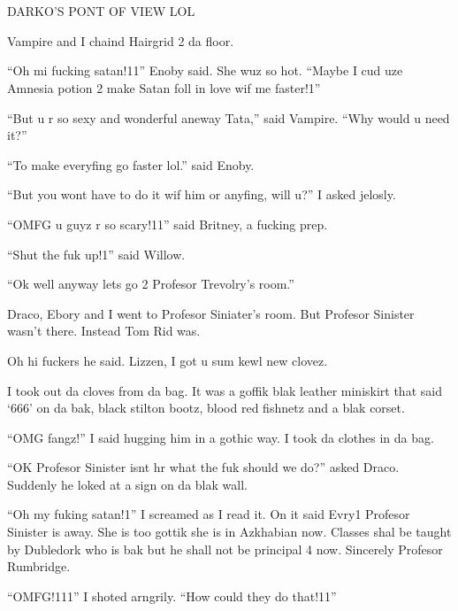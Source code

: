 \section{}


\XXX{\Xfill 666\Xfill}

DARKO'S PONT OF VIEW LOL

Vampire and I chaind Hairgrid 2 da floor.

\enquote{Oh mi fucking satan!11} Enoby said. She wuz so hot. \enquote{Maybe I cud uze Amnesia potion 2 make Satan foll in love wif me faster!1}

\enquote{But u r so sexy and wonderful aneway Tata,} said Vampire. \enquote{Why would u need it?}

\enquote{To make everyfing go faster lol.} said Enoby.

\enquote{But you wont have to do it wif him or anyfing, will u?} I asked jelosly.

\enquote{OMFG u guyz r so scary!11} said Britney, a fucking prep.

\enquote{Shut the fuk up!1} said Willow.

\enquote{Ok well anyway lets go 2 Profesor Trevolry's room.}

Draco, Ebory and I went to Profesor Siniater's room. But Profesor Sinister wasn't there. Instead Tom Rid was.

Oh hi fuckers he said. Lizzen, I got u sum kewl new clovez.

I took out da cloves from da bag. It was a goffik blak leather miniskirt that said \enquote*{666} on da bak, black stilton bootz, blood red fishnetz and a blak corset.

\enquote{OMG fangz!} I said hugging him in a gothic way. I took da clothes in da bag.

\enquote{OK Profesor Sinister isnt hr what the fuk should we do?} asked Draco. Suddenly he loked at a sign on da blak wall.

\enquote{Oh my fuking satan!1} I screamed as I read it. On it said Evry1 Profesor Sinister is away. She is too gottik she is in Azkhabian now. Classes shal be taught by Dubledork who is bak but he shall not be principal 4 now. Sincerely Profesor Rumbridge.

\enquote{OMFG!111} I shoted arngrily. \enquote{How could they do that!11}


